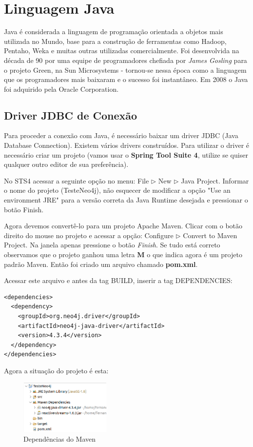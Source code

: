\section{Linguagem Java}
Java é considerada a linguagem de programação orientada a objetos mais utilizada no Mundo, base para a construção de ferramentas como Hadoop, Pentaho, Weka e muitas outras utilizadas comercialmente. Foi desenvolvida na década de 90 por uma equipe de programadores chefiada por \textit{James Gosling} para o projeto Green, na Sun Microsystems - tornou-se nessa época como a linguagem que os programadores mais baixaram e o sucesso foi instantâneo. Em 2008 o Java foi adquirido pela Oracle Corporation.

\subsection{Driver JDBC de Conexão}
Para proceder a conexão com Java, é necessário baixar um driver JDBC (Java Database Connection). Existem vários drivers construídos. Para utilizar o driver é necessário criar um projeto (vamos usar o \textbf{Spring Tool Suite 4}, utilize se quiser qualquer outro editor de sua preferência).

No STS4 acessar a seguinte opção no menu: File $\triangleright$ New $\triangleright$ Java Project. Informar o nome do projeto (TesteNeo4j), não esquecer de modificar a opção "Use an environment JRE" para a versão correta da Java Runtime desejada e pressionar o botão Finish.

Agora devemos convertê-lo para um projeto Apache Maven. Clicar com o botão direito do mouse no projeto e acessar a opção: Configure $\triangleright$ Convert to Maven Project. Na janela apenas pressione o botão \textit{Finish}. Se tudo está correto observamos que o projeto ganhou uma letra \textbf{M} o que indica agora é um projeto padrão Maven. Então foi criado um arquivo chamado \textbf{pom.xml}. 

Acessar este arquivo e antes da tag BUILD, inserir a tag DEPENDENCIES:
\begin{lstlisting}[]
<dependencies>
  <dependency>
    <groupId>org.neo4j.driver</groupId>
    <artifactId>neo4j-java-driver</artifactId>
    <version>4.3.4</version>
  </dependency>
</dependencies>
\end{lstlisting}

Agora a situação do projeto é esta:
\begin{figure}[H]
  \centering
  \includegraphics[width=0.4\textwidth]{imagens/dependenciasMaven}
  \caption{Dependências do Maven}
\end{figure}

